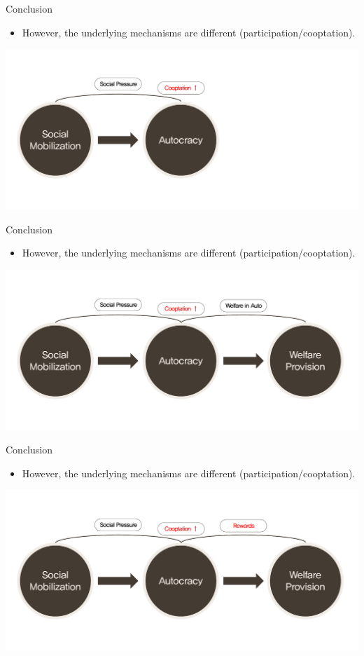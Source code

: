 \documentclass{Bredelebeamer}
\begin{document}
\begin{frame}{Conclusion}
	\begin{itemize}
	\item However, the underlying mechanisms are different (participation/cooptation).
	\end{itemize}
	\centering
	\includegraphics[width=1\linewidth]{"P/PR 4"}
\end{frame}

\begin{frame}{Conclusion}
	\begin{itemize}
	\item However, the underlying mechanisms are different (participation/cooptation).
	\end{itemize}
	\centering
	\includegraphics[width=1\linewidth]{"P/PR 5"}
\end{frame}

\begin{frame}{Conclusion}
	\begin{itemize}
	\item However, the underlying mechanisms are different (participation/cooptation).
	\end{itemize}
	\centering
	\includegraphics[width=1\linewidth]{"P/PR 6"}
\end{frame}
\end{document}
